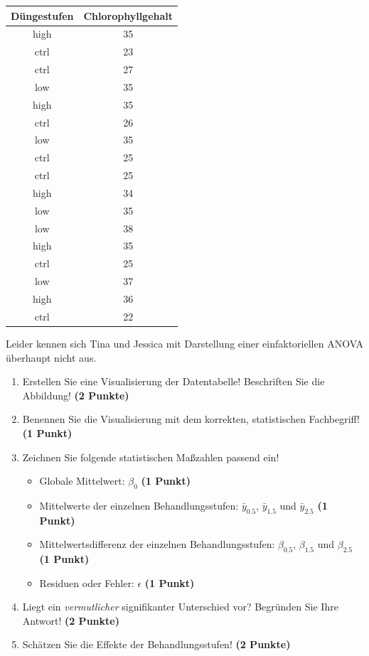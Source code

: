 \documentclass[a4paper, 9pt]{scrartcl}\usepackage[]{graphicx}\usepackage[]{xcolor}
\newenvironment{knitrout}{}{} %
\begin{document}
\begin{knitrout}
\color{fgcolor}\begin{table}[!h]
\centering
\begin{tabular}{cc}
\toprule
Düngestufen & Chlorophyllgehalt\\
\midrule
high & 35\\
ctrl & 23\\
ctrl & 27\\
low & 35\\
high & 35\\
\addlinespace
ctrl & 26\\
low & 35\\
ctrl & 25\\
ctrl & 25\\
high & 34\\
\addlinespace
low & 35\\
low & 38\\
high & 35\\
ctrl & 25\\
low & 37\\
\addlinespace
high & 36\\
ctrl & 22\\
\bottomrule
\end{tabular}
\end{table}

\end{knitrout}

Leider kennen sich Tina und Jessica mit Darstellung einer einfaktoriellen ANOVA überhaupt nicht aus. 

\begin{enumerate}
\item Erstellen  Sie  eine  Visualisierung  der  Datentabelle! Beschriften  Sie  die  Abbildung! \textbf{(2 Punkte)}
\item Benennen Sie die Visualisierung mit dem korrekten, statistischen Fachbegriff! \textbf{(1 Punkt)}
\item Zeichnen Sie folgende statistischen Maßzahlen passend ein! 
  \begin{itemize}
  \item Globale Mittelwert: $\beta_0$ \textbf{(1 Punkt)}
  \item Mittelwerte der einzelnen Behandlungsstufen: $\bar{y}_{0.5}$, $\bar{y}_{1.5}$ und $\bar{y}_{2.5}$ \textbf{(1 Punkt)}
  \item Mittelwertsdifferenz der einzelnen Behandlungsstufen: $\beta_{0.5}$, $\beta_{1.5}$ und $\beta_{2.5}$ \textbf{(1 Punkt)}
  \item Residuen oder Fehler: $\epsilon$ \textbf{(1 Punkt)}
  \end{itemize}
\item Liegt ein \textit{vermutlicher} signifikanter Unterschied vor? Begründen Sie Ihre Antwort! \textbf{(2 Punkte)}
\item Schätzen Sie die Effekte der Behandlungsstufen! \textbf{(2 Punkte)}
\end{enumerate}
 
\end{document}
